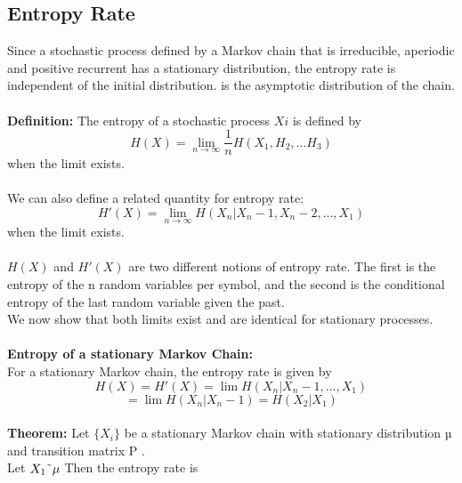 \documentclass[10pt,twocolumn,letterpaper]{article}
\begin{document}
\subsection{Entropy Rate}
Since a stochastic process defined by a Markov chain that is irreducible, aperiodic and positive recurrent has a stationary distribution, the entropy rate is independent of the initial distribution. is the asymptotic distribution of the chain.\\
\\ \textbf{Definition: }The entropy of a stochastic process \begin{math} {X i } \end{math} is deﬁned by
\begin{equation*}
    H(X) = \lim_{n \to \infty} {\frac{1}{n}}H(X_1,H_2, \dots H_3)
\end{equation*} when the limit exists.\\
\\We can also deﬁne a related quantity for entropy rate:
\begin{equation*}
    H'( X ) = \lim_{n \to \infty} H (X_n |X_n−1 , X_n−2 , . . . , X_1 )
\end{equation*} when the limit exists.\\
\\\begin{math}
      H(X) 
\end{math} and \begin{math}
      H'(X)
\end{math} are two different notions of entropy rate. The first is the entropy of the n random variables per symbol, and the second is the conditional entropy of the last random variable given the past. \\ We now show that both limits exist and are identical for stationary processes.\\
\\ \textbf{Entropy of a stationary Markov Chain:}\\
For a stationary Markov chain, the entropy rate is given by
\begin{equation*}
    H ( X ) = H'( X ) = \lim H (X_n |X_n−1 , . . . , X_1 ) 
\end{equation*}
\begin{equation}
= \lim H (X_n |X_n−1 )
= H (X_2 |X_1 )
\end{equation}\\
\textbf{Theorem: }Let \begin{math}
      \{X_i\}
\end{math} be a stationary Markov chain with stationary distribution µ and transition matrix P . \\Let \begin{math}
      X_1  \char`\~ \mu
\end{math} Then the entropy rate is
\end{document}
